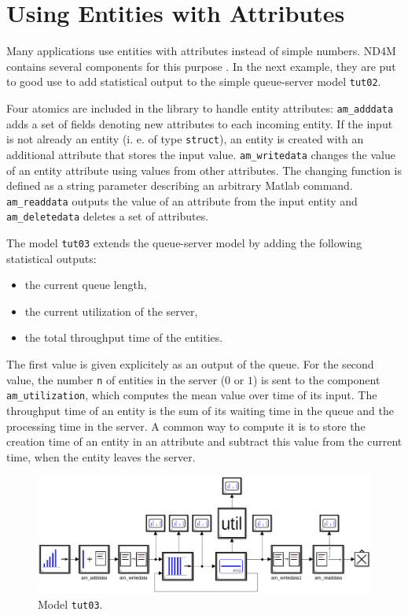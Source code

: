 \documentclass[12pt,oneside,a4paper,bibtotoc,BCOR=0pt,DIV=20]{scrreprt}
\newcommand{\cft}[1]{\mbox{\texttt{#1}}}   %
\begin{document}
\chapter{Using Entities with Attributes}

Many applications use entities with attributes instead of simple numbers. ND4M
contains several components for this purpose \cite{nsaInvitation}. In the next
example, they are put to good use to add statistical output to the simple
queue-server model \cft{tut02}.

Four atomics are included in the library to handle entity attributes:
\cft{am\_adddata} adds a set of fields denoting new attributes to each incoming
entity. If the input is not already an entity (i. e. of type \cft{struct}), an
entity is created with an additional attribute that stores the input
value. \cft{am\_writedata} changes the value of an entity attribute using
values from other attributes. The changing function is defined as a string
parameter describing an arbitrary Matlab command. \cft{am\_readdata} outputs
the value of an attribute from the input entity and \cft{am\_deletedata}
deletes a set of attributes.

The model \cft{tut03} extends the queue-server model by adding the following
statistical outputs:
\begin{itemize}
\item the current queue length,
\item the current utilization of the server,
\item the total throughput time of the entities.
\end{itemize}
The first value is given explicitely as an output of the queue. For the second
value, the number \cft{n} of entities in the server ($0$ or $1$) is sent to the
component \cft{am\_utilization}, which computes the mean value over time of its
input. The throughput time of an entity is the sum of its waiting time in the
queue and the processing time in the server. A common way to compute it is to
store the creation time of an entity in an attribute and subtract this value
from the current time, when the entity leaves the server.
\begin{figure}[ht]
\centering
\includegraphics[width=0.81\columnwidth]{images/bild06.pdf}
\caption{Model \cft{tut03}.}
\label{fig_6}
\end{figure}
\end{document}
